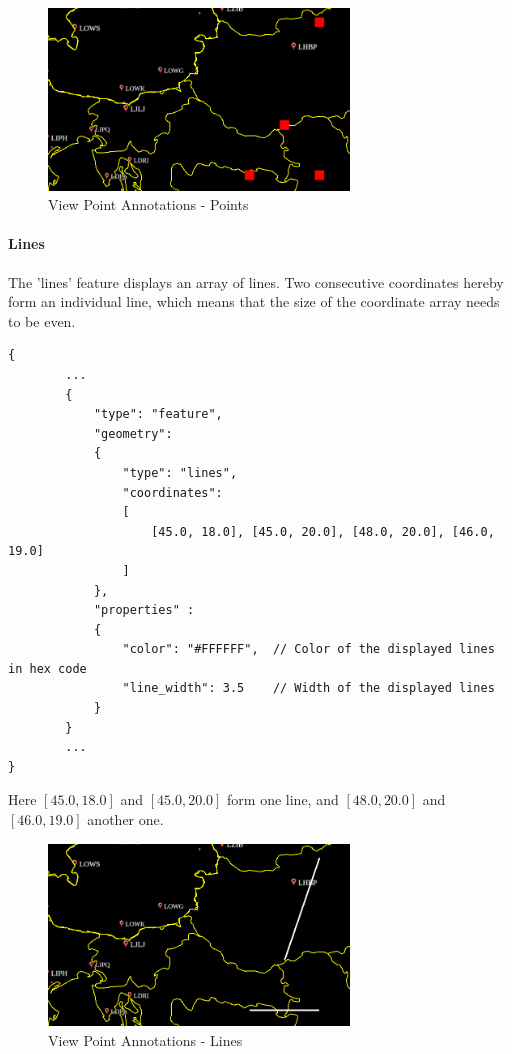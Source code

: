 \begin{figure}[H]
    \center
      \includegraphics[width=8cm]{figures/viewpoints_anno_example_points.png}
    \caption{View Point Annotations - Points} 
\end{figure}

\paragraph{Lines} The 'lines' feature displays an array of lines. 
Two consecutive coordinates hereby form an individual line, which means that the size of the coordinate array needs to be even.

\begin{lstlisting}[basicstyle=\small\ttfamily]
{
        ...
        {
            "type": "feature",
            "geometry":
            {
                "type": "lines",
                "coordinates": 
                [
                    [45.0, 18.0], [45.0, 20.0], [48.0, 20.0], [46.0, 19.0]
                ]
            },
            "properties" :
            {
                "color": "#FFFFFF",  // Color of the displayed lines in hex code
                "line_width": 3.5    // Width of the displayed lines
            }
        }
        ...
}
\end{lstlisting}

Here $[45.0, 18.0]$ and $[45.0, 20.0]$ form one line, and $[48.0, 20.0]$ and $[46.0, 19.0]$ another one.

\begin{figure}[H]
    \center
        \includegraphics[width=8cm]{figures/viewpoints_anno_example_lines.png}
    \caption{View Point Annotations - Lines} 
\end{figure}


